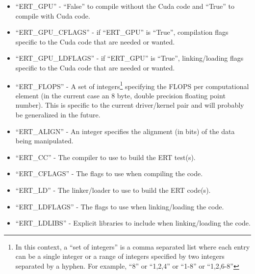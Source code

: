 \begin{itemize}
\vspace{-0.1in}
\item{``ERT\_\+GPU'' - ``False'' to compile without the Cuda code and
``True'' to compile with Cuda code.}

\vspace{-0.1in}
\item{``ERT\_\+GPU\_\+CFLAGS'' - if ``ERT\_\+GPU'' is ``True'',
compilation flags specific to the Cuda code that are needed or wanted.}

\vspace{-0.1in}
\item{``ERT\_\+GPU\_\+LDFLAGS'' - if ``ERT\_\+GPU'' is ``True'',
linking/loading flags specific to the Cuda code that are needed or wanted.}

\vspace{-0.1in}
\item{``ERT\_\+FLOPS'' - A set of integers\footnote
{In this context, a ``set of integers'' is a comma separated list where each
entry can be a single integer or a range of integers specified by two integers
separated by a hyphen.  For example, ``8'' or ``1,2,4'' or ``1-8'' or
``1,2,6-8''}
specifying the FLOPS per computational element (in the current case an 8
byte, double precision floating point number).  This is specific to the
current driver/kernel pair and will probably be generalized in the future.}

\vspace{-0.1in}
\item{``ERT\_\+ALIGN'' - An integer specifies the alignment (in bits) of the
data being manipulated.}

\vspace{-0.1in}
\item{``ERT\_\+CC'' - The compiler to use to build the ERT test(s).}

\vspace{-0.1in}
\item{``ERT\_\+CFLAGS'' - The flags to use when compiling the code.}

\vspace{-0.1in}
\item{``ERT\_\+LD'' - The linker/loader to use to build the ERT code(s).}

\vspace{-0.1in}
\item{``ERT\_\+LDFLAGS'' - The flags to use when linking/loading the code.}

\vspace{-0.1in}
\item{``ERT\_\+LDLIBS'' - Explicit libraries to include when linking/loading
the code.}

\end{itemize}


